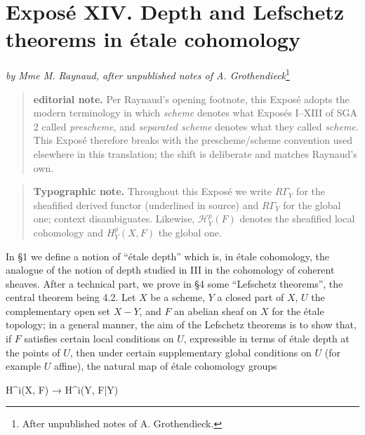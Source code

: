 \documentclass[
]{article}
\newenvironment{Shaded}{}{}
\newcommand{\NormalTok}[1]{#1}
\begin{document}
\section{Exposé XIV. Depth and Lefschetz theorems in étale
cohomology}\label{exposuxe9-xiv.-depth-and-lefschetz-theorems-in-uxe9tale-cohomology}

\emph{by Mme M. Raynaud, after unpublished notes of A.
Grothendieck}\footnote{After unpublished notes of A. Grothendieck.}

\begin{quote}
\textbf{editorial note.} Per Raynaud's opening footnote, this Exposé
adopts the modern terminology in which \emph{scheme} denotes what
Exposés I--XIII of SGA 2 called \emph{prescheme}, and \emph{separated
scheme} denotes what they called \emph{scheme}. This Exposé therefore
breaks with the prescheme/scheme convention used elsewhere in this
translation; the shift is deliberate and matches Raynaud's own.
\end{quote}

\begin{quote}
\textbf{Typographic note.} Throughout this Exposé we write
\(R\Gamma_{Y}\) for the sheafified derived functor (underlined in
source) and \(R\Gamma_{Y}\) for the global one; context disambiguates.
Likewise, \(\mathcal{H}^{p}_{Y}(F)\) denotes the sheafified local
cohomology and \(H^{p}_{Y}(X, F)\) the global one.
\end{quote}

In §1 we define a notion of ``étale depth'' which is, in étale
cohomology, the analogue of the notion of depth studied in III in the
cohomology of coherent sheaves. After a technical part, we prove in §4
some ``Lefschetz theorems'', the central theorem being 4.2. Let \(X\) be
a scheme, \(Y\) a closed part of \(X\), \(U\) the complementary open set
\(X - Y\), and \(F\) an abelian sheaf on \(X\) for the étale topology;
in a general manner, the aim of the Lefschetz theorems is to show that,
if \(F\) satisfies certain local conditions on \(U\), expressible in
terms of étale depth at the points of \(U\), then under certain
supplementary global conditions on \(U\) (for example \(U\) affine), the
natural map of étale cohomology groups

\begin{Shaded}
\begin{Highlighting}[]
\NormalTok{H\^{}i(X, F) → H\^{}i(Y, F|Y)}
\end{Highlighting}
\end{Shaded}
\end{document}
